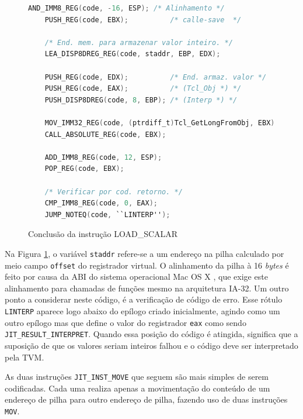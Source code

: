 
\begin{figure}[h]
  \centering
  \begin{lstlisting}[language=C]
    AND_IMM8_REG(code, -16, ESP); /* Alinhamento */
    PUSH_REG(code, EBX);          /* calle-save  */

    /* End. mem. para armazenar valor inteiro. */
    LEA_DISP8DREG_REG(code, staddr, EBP, EDX);

    PUSH_REG(code, EDX);          /* End. armaz. valor */
    PUSH_REG(code, EAX);          /* (Tcl_Obj *) */
    PUSH_DISP8DREG(code, 8, EBP); /* (Interp *) */

    MOV_IMM32_REG(code, (ptrdiff_t)Tcl_GetLongFromObj, EBX);
    CALL_ABSOLUTE_REG(code, EBX);

    ADD_IMM8_REG(code, 12, ESP);
    POP_REG(code, EBX);

    /* Verificar por cod. retorno. */
    CMP_IMM8_REG(code, 0, EAX);
    JUMP_NOTEQ(code, ``LINTERP'');
  \end{lstlisting}
  \caption{Conclusão da instrução LOAD\_SCALAR \label{fimloadscalar}}
\end{figure}

Na Figura \ref{fimloadscalar}, o variável \verb!staddr!
refere-se a um endereço na pilha calculado por meio campo
\verb!offset! do registrador virtual. O alinhamento da pilha à 16
\textit{bytes} é feito por causa da ABI do sistema operacional Mac OS
X \cite{macosx-abi}, que exige este alinhamento para chamadas de
funções mesmo na arquitetura IA-32. Um outro ponto a considerar neste
código, é a verificação de código de erro. Esse rótulo \verb!LINTERP!
aparece logo abaixo do epílogo criado inicialmente, agindo como um
outro epílogo mas que define o valor do registrador \verb!eax! como
sendo \verb!JIT_RESULT_INTERPRET!. Quando essa posição do código é
atingida, significa que a suposição de que os valores seriam inteiros
falhou e o código deve ser interpretado pela TVM.

As duas instruções \verb!JIT_INST_MOVE! que seguem são mais simples de
serem codificadas. Cada uma realiza apenas a movimentação do conteúdo de
um endereço de pilha para outro endereço de pilha, fazendo uso de duas
instruções \verb!MOV!.

